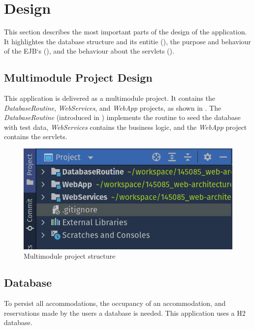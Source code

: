 \section{Design}\label{sec:02_design}
This section describes the most important parts of the design of the application. It highlightes the database structure and its entitie (), the purpose and behaviour of the EJB`s (), and the behaviour about the servlets ().


\subsection{Multimodule Project Design}\label{sec:02_design_project}
This application is delivered as a multimodule project. It contains the \textit{DatabaseRoutine}, \textit{WebServices}, and \textit{WebApp} projects, as shown in .
The \textit{DatabaseRoutine} (introduced in ) implements the routine to seed the database with test data, \textit{WebServices} contains the business logic, and the \textit{WebApp} project contains the servlets.
\begin{figure}[h]
\centering
\includegraphics[scale=0.5]{images/02_design/design-project}
\caption{Multimodule project structure}
\label{fig:02_design_project_structure}
\end{figure}


\subsection{Database}\label{sec:02_design_db}
To persist all accommodations, the occupancy of an accommodation, and reservations made by the users a database is needed. This application uses a H2 database.

